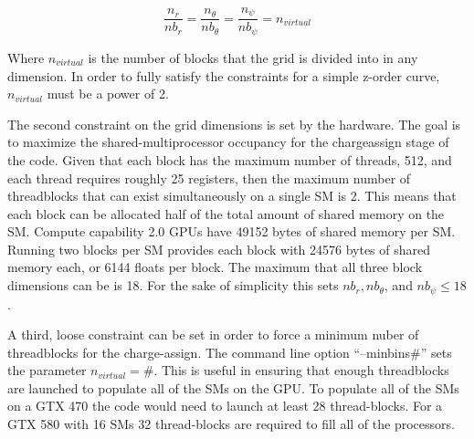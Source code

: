\begin{equation}
\frac{n_r}{nb_r} = \frac{n_{\theta}}{nb_{\theta}} = \frac{n_{\psi}}{nb_{\psi}} = n_{virtual}
\end{equation} 

Where $n_{virtual}$ is the number of blocks that the grid is divided into in any dimension. In order to fully satisfy the constraints for a simple z-order curve, $n_{virtual}$ must be a power of 2.

The second constraint on the grid dimensions is set by the hardware. The goal is to maximize the shared-multiprocessor occupancy for the chargeassign stage of the code. Given that each block has the maximum number of threads, 512, and each thread requires roughly 25 registers, then the maximum number of threadblocks that can exist simultaneously on a single SM is 2. This means that each block can be allocated half of the total amount of shared memory on the SM. Compute capability 2.0 GPUs have 49152 bytes of shared memory per SM. Running two blocks per SM provides each block with 24576 bytes of shared memory each, or 6144 floats per block. The maximum that all three block dimensions can be is 18. For the sake of simplicity this sets $nb_r, nb_{\theta}$, and $nb_{\psi} \le 18$. 

A third, loose constraint can be set in order to force a minimum nuber of threadblocks for the charge-assign. The command line option ``--minbins\#'' sets the parameter $n_{virtual} = \#$. This is useful in ensuring that enough threadblocks are launched to populate all of the SMs on the GPU. To populate all of the SMs on a GTX 470 the code would need to launch at least 28 thread-blocks. For a GTX 580 with 16 SMs 32 thread-blocks are required to fill all of the processors.  



